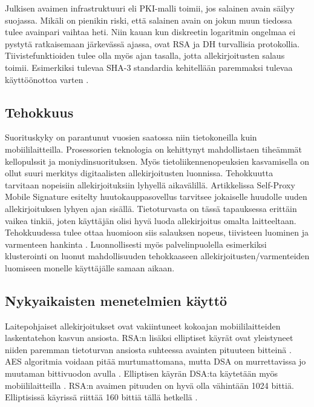 \documentclass[finnish]{tktltiki2}
\theoremstyle{definition}
\theoremstyle{remark}
\begin{document}
Julkisen avaimen infrastruktuuri eli PKI-malli toimii, jos salainen avain säilyy suojassa. Mikäli on pienikin riski, että salainen avain on jokun muun tiedossa tulee avainpari vaihtaa heti. Niin kauan kun diskreetin logaritmin ongelmaa ei pystytä ratkaisemaan järkevässä ajassa, ovat RSA ja DH turvallisia protokollia. Tiivistefunktioiden tulee olla myös ajan tasalla, jotta allekirjoitusten salaus toimii. Esimerkiksi tulevaa SHA-3 standardia kehitellään paremmaksi tulevaa käyttöönottoa varten \cite{nist}.
	  

\subsection{Tehokkuus}

Suorituskyky on parantunut vuosien saatossa niin tietokoneilla kuin mobiililaitteilla. Prosessorien teknologia on kehittynyt mahdollistaen tiheämmät kellopulssit ja moniydinsuorituksen. Myös tietoliikennenopeuksien kasvamisella on ollut suuri merkitys digitaalisten allekirjoitusten luonnissa. Tehokkuutta tarvitaan nopeisiin allekirjoituksiin lyhyellä aikavälillä. Artikkelissa Self-Proxy Mobile Signature \cite{proxy} esitelty huutokauppasovellus tarvitsee jokaiselle huudolle uuden  allekirjoituksen lyhyen ajan sisällä. Tietoturvasta on tässä tapauksessa erittäin vaikea tinkiä, joten käyttäjän olisi hyvä luoda allekirjoitus omalta laitteeltaan. Tehokkuudessa tulee ottaa huomioon siis salauksen nopeus, tiivisteen luominen ja varmenteen hankinta \cite{proxy}. Luonnollisesti myös palvelinpuolella esimerkiksi klusterointi on luonut mahdollisuuden tehokkaaseen allekirjoitusten/varmenteiden luomiseen monelle käyttäjälle samaan aikaan.

\subsection{Nykyaikaisten menetelmien käyttö}

Laitepohjaiset allekirjoitukset ovat vakiintuneet kokoajan mobiililaitteiden laskentatehon kasvun ansiosta. RSA:n lisäksi elliptiset käyrät ovat yleistyneet niiden paremman tietoturvan ansiosta suhteessa avainten pituuteen bitteinä \cite{ECC}. AES algoritmia voidaan pitää murtumattomana, mutta DSA on murrettavissa jo muutaman bittivuodon avulla \cite{gsm}. Elliptisen käyrän DSA:ta käytetään myös mobiililaitteilla \cite{webs}. RSA:n avaimen pituuden on hyvä olla vähintään 1024 bittiä. Elliptisissä käyrissä riittää 160 bittiä tällä hetkellä \cite{ECC}.
\end{document}
